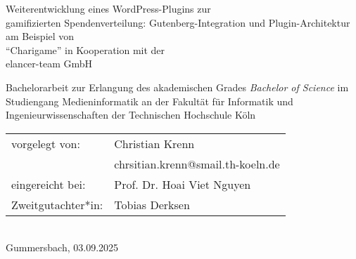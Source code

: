 \begin{titlepage}
%
\sffamily%
%
\begin{center}
\end{center}
%
\vfill
%
\begin{huge}
    Weiterentwicklung eines WordPress-Plugins zur \\gamifizierten Spendenverteilung:
    Gutenberg-Integration und Plugin-Architektur am Beispiel von \\``Charigame'' in Kooperation mit der \\elancer-team GmbH\\[10mm]
\end{huge}
%
Bachelorarbeit zur Erlangung des akademischen Grades\newline
\emph{Bachelor of Science}\newline
im Studiengang Medieninformatik\newline
an der Fakultät für Informatik und Ingenieurwissenschaften\newline
der Technischen Hochschule Köln
%
\vfill
%
\begin{tabular}{@{}ll}
vorgelegt von: & Christian Krenn\\
               & chrsitian.krenn@smail.th-koeln.de\\[5mm]
eingereicht bei:   & Prof. Dr. Hoai Viet Nguyen\\
Zweitgutachter*in: & Tobias Derksen
\end{tabular}	
%
\\[10mm]
%
Gummersbach, 03.09.2025%
%
\rmfamily%
%
\end{titlepage}